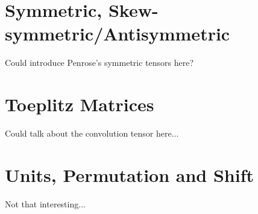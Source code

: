 \section{Symmetric, Skew-symmetric/Antisymmetric}
\label{sec:symmetric}

Could introduce Penrose's symmetric tensors here?

\section{Toeplitz Matrices}
Could talk about the convolution tensor here...
\section{Units, Permutation and Shift}
Not that interesting...

